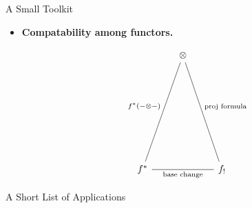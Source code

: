 \documentclass[final]{beamer}
\newlength{\colwidth}
\begin{document}
\begin{frame}[t]
\begin{columns}[t]
\begin{column}{\colwidth}
\begin{block}{A Small Toolkit}
\begin{itemize}
  \[\begin{tikzcd}[ampersand replacement=\&]
  	{D(Z)} \& {D(X)} \& {D(U)}
  	\arrow["{i_*=i_!}", from=1-1, to=1-2]
  	\arrow["{i^*}"', curve={height=60pt}, from=1-2, to=1-1]
  	\arrow["{i^!}", curve={height=-60pt}, from=1-2, to=1-1]
  	\arrow["{j^*=j^!}", from=1-2, to=1-3]
  	\arrow["{j_!}"', curve={height=60pt}, from=1-3, to=1-2]
  	\arrow["{Rj_*}", curve={height=-60pt}, from=1-3, to=1-2]
  \end{tikzcd}\]
  \[\begin{tikzcd}[ampersand replacement=\&]
  	{j_!j^* \mathcal{F}} \& {\mathcal{F}} \& {i_!i^*\mathcal{F}} \& {}
  	\arrow[from=1-1, to=1-2]
  	\arrow[from=1-2, to=1-3]
  	\arrow["{+1}", from=1-3, to=1-4]
  \end{tikzcd}\]
  
  
  \item \textbf{Compatability among functors.}
  
  \[\begin{tikzcd}[ampersand replacement=\&]
  	\& \otimes \\[30mm]
  	{f^*} \&\& {f_!}
  	\arrow["{f^*(-\otimes -)}"', no head, from=1-2, to=2-1]
  	\arrow["{\text{proj formula}}", no head, from=1-2, to=2-3]
  	\arrow["{\text{base change}}"', no head, from=2-1, to=2-3]
  \end{tikzcd}\]
  
  
  \end{itemize}






  \end{block}


  \begin{alertblock}{A Short List of Applications}


\end{alertblock}
\end{column}
\end{columns}
\end{frame}
\end{document}

